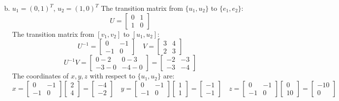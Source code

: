 \documentclass{article}
\begin{document}
\begin{enumerate}[(a)]
$$    $$
    \item
    $u_1 = (0,1)^T$, $u_2 = (1,0)^T$
    The transition matrix from $\{u_1, u_2\}$ to $\{e_1, e_2\}$:
    $$ U = \begin{bmatrix} 0 & 1 \\ 1 & 0 \end{bmatrix} $$
    The transition matrix from $[v_1, v_2]$ to $[u_1, u_2]$:
    $$ U^{-1} = \begin{bmatrix} 0 & -1 \\ -1 & 0 \end{bmatrix} \quad
    V = \begin{bmatrix} 3 & 4 \\ 2 & 3 \end{bmatrix} $$
    $$ U^{-1}V = \begin{bmatrix} 0-2 & 0-3 \\ -3-0 & -4-0 \end{bmatrix} =
    \begin{bmatrix} -2 & -3 \\ -3 & -4 \end{bmatrix} $$
    The coordinates of $x, y, z$ with respect to $\{u_1, u_2\}$ are:
    $$
    x = \begin{bmatrix} 0 & -1 \\ -1 & 0 \end{bmatrix} \begin{bmatrix} 2 \\ 4 \end{bmatrix}
     = \begin{bmatrix} -4 \\ -2 \end{bmatrix}
    \quad
    y = \begin{bmatrix} 0 & -1 \\ -1 & 0 \end{bmatrix} \begin{bmatrix} 1 \\ 1 \end{bmatrix}
     = \begin{bmatrix} -1 \\ -1 \end{bmatrix}
    \quad
    z = \begin{bmatrix} 0 & -1 \\ -1 & 0 \end{bmatrix} \begin{bmatrix} 0 \\ 10 \end{bmatrix}
     = \begin{bmatrix} -10 \\ 0 \end{bmatrix}
    $$
\end{enumerate}
\end{document}
